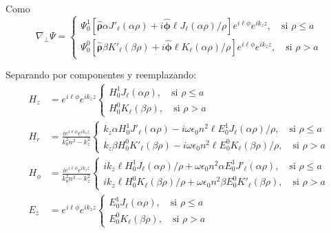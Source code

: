 Como 
\begin{equation*}
	\nabla_\perp \Psi =
	\left\{	
	\begin{matrix}
		\Psi_0^1\left[\boldsymbol{\hat{\rho}}\alpha J'_\ell (\alpha \rho) + i \boldsymbol{\hat{\phi}} \ell J_\ell (\alpha \rho)/\rho\right] e^{i\ell\phi} e^{i k_z z}, \quad \text{si } \rho \le a  
		\\
		\Psi_0^0\left[\boldsymbol{\hat{\rho}}\beta K'_\ell (\beta\rho) +i \boldsymbol{\hat{\phi}}\ell K_\ell (\alpha \rho)/\rho \right]e^{i\ell\phi} e^{i k_z z} , \quad \text{si } \rho > a  
	\end{matrix}
	\right.
\end{equation*}

Separando por componentes y reemplazando:
\begin{align*}
		H_z &=  e^{i\ell\phi}e^{i k_z z}
	  	 \left\{
		\begin{matrix}	  	 
	  	 H_0^1 J_\ell (\alpha \rho), \quad \text{si } \rho \le a  
	  	 \\
	  	 H_0^0 K_\ell (\beta \rho), \quad \text{si } \rho > a  
	  	 \end{matrix}
	  	 \right.	
		\\
	  	 H_r &= \frac{i e^{i\ell\phi}e^{i k_z z} }{k_0^2 n^2 - k_z^2}
	  	 \left\{
		\begin{matrix}	  	 
	  	  k_z \alpha H_0^1 J'_\ell (\alpha \rho) - i\omega \epsilon_0 n^2\ell E_0^1 J_\ell (\alpha \rho)/\rho, \quad \text{si } \rho \le a  
	  	 \\
	  	 k_z \beta H_0^0  K'_\ell (\beta \rho) - i\omega \epsilon_0 n^2\ell E_0^0 K_\ell (\beta \rho)/\rho  , \quad \text{si } \rho > a  
	  	 \end{matrix}
	  	 \right.
	  	 \\
		H_\phi &= \frac{ie^{i\ell\phi} e^{i k_z z}}{k_0^2 n^2 - k_z^2}
		\left\{
		\begin{matrix}
			ik_z\ell H_0^1  J_\ell (\alpha \rho)/\rho + \omega \epsilon_0 n^2  \alpha E_0^1 J'_\ell (\alpha \rho), \quad \text{si } \rho \le a  
			\\
			ik_z \ell H_0^0  K_\ell (\beta \rho)/\rho + \omega \epsilon_0 n^2 \beta E_0^0  K'_\ell (\beta \rho), \quad \text{si } \rho > a  
		\end{matrix}
		\right.
		\\
		E_z &= e^{i\ell\phi} e^{i k_z z}
	  	 \left\{
		\begin{matrix}	  	 
	  	 E_0^1 J_\ell (\alpha \rho), \quad \text{si } \rho \le a  
	  	 \\
	  	 E_0^0 K_\ell (\beta \rho), \quad \text{si } \rho > a  

\end{matrix}
\end{align*}
